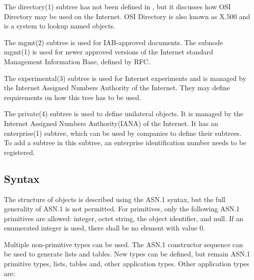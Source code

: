 The directory(1) subtree has not been defined in \cite{RFC:RFC1155:1990}, but it discusses how OSI Directory may be used on the Internet. OSI Directory is also known as X.500 and is a system to lookup named objects. 

The mgmt(2) subtree is used for IAB-approved documents. The subnode mgmt(1) is used for newer approved versions of the Internet standard Management Information Base, defined by RFC.

The experimental(3) subtree is used for Internet experiments and is managed by the Internet Assigned Numbers Authority of
the Internet. They may define requirements on how this tree has to be used.

The private(4) subtree is used to define unilateral objects. It is managed by the Internet Assigned Numbers Authority(IANA) of the Internet. It has an enterprise(1) subtree, which can be used by companies to define their subtrees. To add a subtree in this subtree, an enterprise identification number needs to be registered.

\subsection{Syntax}
\label{Section:MIB-Syntax}

The structure of objects is described using the ASN.1 syntax, but the full generality of ASN.1 is not permitted. For primitives, only the following ASN.1 primitives are allowed: integer, octet string, the object identifier, and null. If an enumerated integer is used, there shall be no element with value 0.

Multiple non-primitive types can be used. The ASN.1 constructor sequence can be used to generate lists and tables. New types can be defined, but remain ASN.1 primitive types, lists, tables and, other application types. Other application types are:

